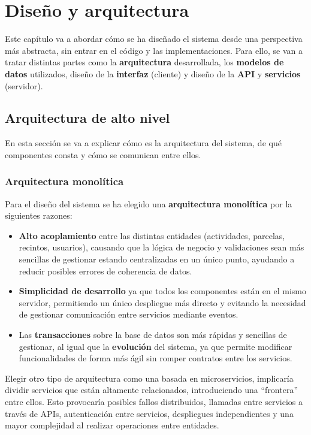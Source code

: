 \chapter{Diseño y arquitectura}

Este capítulo va a abordar cómo se ha diseñado el sistema desde una perspectiva más abstracta, sin entrar en el código y las implementaciones. Para ello, se van a tratar distintas partes como
la \textbf{arquitectura} desarrollada, los \textbf{modelos de datos} utilizados, diseño de la \textbf{interfaz} (cliente) y diseño de la \textbf{API} y \textbf{servicios} (servidor).

\section{Arquitectura de alto nivel}

En esta sección se va a explicar cómo es la arquitectura del sistema, de qué componentes consta y cómo se comunican entre ellos.

\subsection{Arquitectura monolítica}

Para el diseño del sistema se ha elegido una \textbf{arquitectura monolítica} por la siguientes razones:

\begin{itemize}
    \item \textbf{Alto acoplamiento} entre las distintas entidades (actividades, parcelas, recintos, usuarios), causando que la lógica de negocio y validaciones sean más sencillas de gestionar estando centralizadas
    en un único punto, ayudando a reducir posibles errores de coherencia de datos.
    \item \textbf{Simplicidad de desarrollo} ya que todos los componentes están en el mismo servidor, permitiendo un único despliegue más directo y evitando la necesidad de gestionar comunicación entre servicios 
    mediante eventos.
    \item Las \textbf{transacciones} sobre la base de datos son más rápidas y sencillas de gestionar, al igual que la \textbf{evolución} del sistema, ya que permite modificar funcionalidades de forma más ágil sin
    romper contratos entre los servicios.
\end{itemize} 

Elegir otro tipo de arquitectura como una basada en microservicios, implicaría dividir servicios que están altamente relacionados, introduciendo una ``frontera'' entre ellos. Esto provocaría 
posibles fallos distribuidos, llamadas entre servicios a través de APIs, autenticación entre servicios, despliegues independientes y una mayor complejidad al realizar operaciones entre entidades. 

